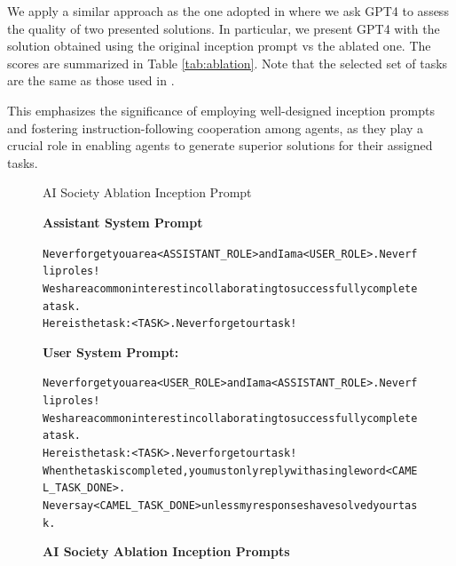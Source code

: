 We apply a similar approach as the one adopted in \secLabel \label{eval1} where we ask GPT4 to assess the quality of two presented solutions. In particular, we present GPT4 with the solution obtained using the original inception prompt vs the ablated one. The scores are summarized in Table \ref{tab:ablation}. Note that the selected set of tasks are the same as those used in \secLabel \label{eval1}.

This emphasizes the significance of employing well-designed inception prompts and fostering instruction-following cooperation among agents, as they play a crucial role in enabling agents to generate superior solutions for their assigned tasks.

\begin{figure}[h]
	\begin{AIBox}{AI Society Ablation Inception Prompt}
		\parbox[t]{0.5\textwidth}{{\bf Assistant System Prompt} \scriptsize \begin{alltt}
				Never forget you are a <ASSISTANT\_ROLE> and I am a <USER\_ROLE>. Never flip roles!
				We share a common interest in collaborating to successfully complete a task.
				Here is the task: <TASK>. Never forget our task! \end{alltt}}
		\parbox[t]{0.5\textwidth}{{\bf User System Prompt:} \scriptsize \begin{alltt}
				Never forget you are a <USER\_ROLE> and I am a <ASSISTANT\_ROLE>. Never flip roles!
				We share a common interest in collaborating to successfully complete a task.
				Here is the task: <TASK>. Never forget our task!
				When the task is completed, you must only reply with a single word <CAMEL\_TASK\_DONE>.
				Never say <CAMEL\_TASK\_DONE> unless my responses have solved your task.
			\end{alltt}}
	\end{AIBox}
	\caption{\textbf{AI Society Ablation Inception Prompts}}
	\label{fig:ablation_inception_prompts}
\end{figure}


\begin{table}[h]
	\centering
	\caption{\textbf{Agent Evaluation With Ablated Inception Prompt}}
	\label{tab:ablation}
\end{table}



